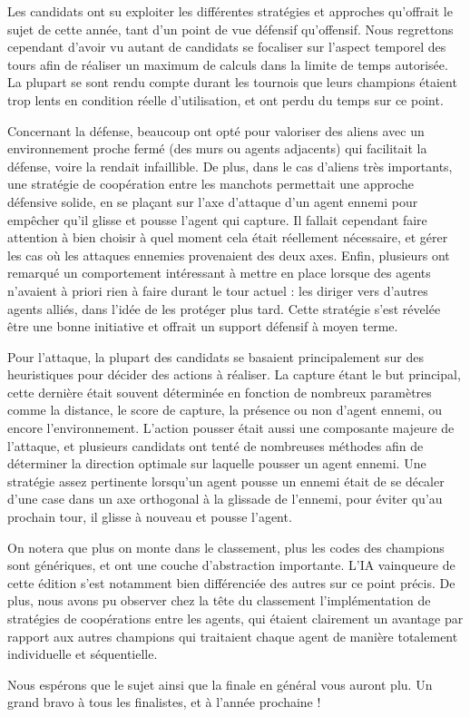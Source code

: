 \documentclass[a4paper,12pt,notitle,noheader,nofooter]{prologin}
\begin{document}
\bigbreak

Les candidats ont su exploiter les différentes stratégies et approches
qu'offrait le sujet de cette année, tant d'un point de vue défensif qu'offensif.
Nous regrettons cependant d'avoir vu autant de candidats se focaliser sur
l'aspect temporel des tours afin de réaliser un maximum de calculs dans la
limite de temps autorisée. La plupart se sont rendu compte durant les tournois
que leurs champions étaient trop lents en condition réelle d'utilisation, et ont
perdu du temps sur ce point.

\bigbreak

Concernant la défense, beaucoup ont opté pour valoriser des aliens avec un
environnement proche fermé (des murs ou agents adjacents) qui facilitait la
défense, voire la rendait infaillible. De plus, dans le cas d'aliens très
importants, une stratégie de coopération entre les manchots permettait une
approche défensive solide, en se plaçant sur l'axe d'attaque d'un agent ennemi
pour empêcher qu'il glisse et pousse l'agent qui capture. Il fallait cependant
faire attention à bien choisir à quel moment cela était réellement nécessaire,
et gérer les cas où les attaques ennemies provenaient des deux axes. Enfin,
plusieurs ont remarqué un comportement intéressant à mettre en place lorsque des
agents n'avaient à priori rien à faire durant le tour actuel : les diriger vers
d'autres agents alliés, dans l'idée de les protéger plus tard. Cette stratégie
s'est révelée être une bonne initiative et offrait un support défensif à moyen
terme.

\bigbreak

Pour l'attaque, la plupart des candidats se basaient principalement sur des
heuristiques pour décider des actions à réaliser. La capture étant le but
principal, cette dernière était souvent déterminée en fonction de nombreux
paramètres comme la distance, le score de capture, la présence ou non d'agent
ennemi, ou encore l'environnement. L'action pousser était aussi une composante
majeure de l'attaque, et plusieurs candidats ont tenté de nombreuses méthodes 
afin de déterminer la direction optimale sur laquelle pousser un agent ennemi.
Une stratégie assez pertinente lorsqu'un agent pousse un ennemi était de se
décaler d'une case dans un axe orthogonal à la glissade de l'ennemi, pour éviter
qu'au prochain tour, il glisse à nouveau et pousse l'agent.

\newpage

On notera que plus on monte dans le classement, plus les codes des champions
sont génériques, et ont une couche d'abstraction importante. L'IA vainqueure de
cette édition s'est notamment bien différenciée des autres sur ce point précis.
De plus, nous avons pu observer chez la tête du classement l'implémentation de
stratégies de coopérations entre les agents, qui étaient clairement un avantage
par rapport aux autres champions qui traitaient chaque agent de manière
totalement individuelle et séquentielle.

\bigbreak

Nous espérons que le sujet ainsi que la finale en général vous auront plu. Un
grand bravo à tous les finalistes, et à l'année prochaine !
\end{document}
